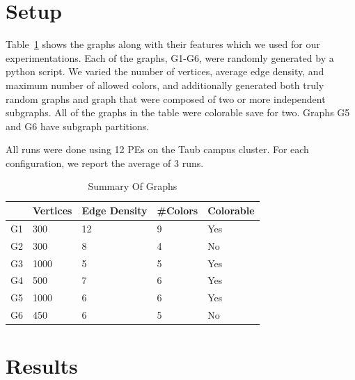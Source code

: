\documentclass[10pt,oneside]{article}
\begin{document}
\section{Setup}

  Table~\ref{tb:1} shows the graphs along with their features which
  we used for our experimentations. 
  Each of the graphs, G1-G6, were randomly generated by a python script. We
  varied the number of vertices, average edge density, and maximum number of
  allowed colors, and additionally generated both truly random graphs and graph
  that were composed of two or more independent subgraphs. All of the graphs in
  the table were colorable save for two. Graphs G5 and G6 have subgraph partitions.

  All runs were done using 12 PEs on the Taub campus cluster. For each configuration,
  we report the average of 3 runs.

\begin{table}[h]
\centering
\begin{tabular}{|l|l|l|l|l|}
\hline
   & Vertices & Edge Density & \#Colors &  Colorable   \\ \hline
G1 & 300      & 12           & 9        & Yes \\ \hline
G2 & 300      & 8            & 4        & No  \\ \hline
G3 & 1000     & 5            & 5        & Yes \\ \hline
G4 & 500      & 7            & 6        & Yes \\ \hline
G5 & 1000     & 6            & 6        & Yes \\ \hline
G6 & 450      & 6            & 5        & No \\ \hline
\end{tabular}
\caption{Summary Of Graphs}
\label{tb:1}
\end{table}

\section{Results}
\end{document}

